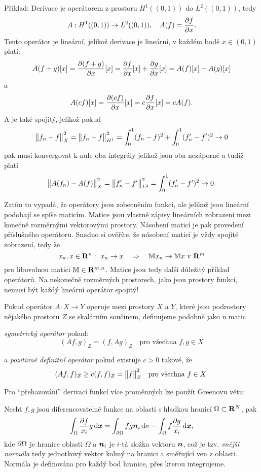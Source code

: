 Příklad: Derivace je operátorem z prostoru $H^1((0,1))$ do $L^2((0,1))$, tedy
\[
        A:H^1((0,1)) \rightarrow L^2((0,1)),\quad A(f)=\frac{\partial f}{\partial x}.
\]
Tento operátor je lineární, jelikož derivace je lineární, v každém bodě $x\in (0,1)$ platí:
\[
        A(f+g)[x]=\frac{\partial(f+g)}{\partial x}[x]=
        \frac{\partial f}{\partial x}[x] +\frac{\partial g}{\partial x}[x]=A(f)[x]+A(g)[x]  
\]
a
\[
  A(cf)[x]=\frac{\partial (cf)}{\partial x}[x]=c\frac{\partial f}{\partial x}[x]=cA(f).
\]
A je také spojitý, jelikož pokud 
\[
   \bigl\Vert f_n - f\bigr\Vert_X^2 = \bigl\Vert f_n - f\bigr\Vert^2_{H^1}=\int_0^1 (f_n-f)^2 +\int_0^1 (f'_n-f')^2 \rightarrow 0
\]
pak musí konvergovat k nule oba integrály jelikož jsou oba nezáporné a tudíž platí
\[
  \bigl\Vert A(f_n) - A(f) \bigr\Vert^2_X =\bigl\Vert f'_n-f'\bigr\Vert^2_{L^2} =\int_0^1 (f'_n-f')^2 \rightarrow 0. 
\]

Zatím to vypadá, že operátory jsou zobecněním funkcí, ale jelikož jsou lineární podobají se spíše maticím.
Matice jsou vlastně zápisy lineárních zobrazení mezi konečně rozměrnými vektorovými prostory. Násobení maticí je
pak provedení příslušného operátoru.  Snadno si ověříte, že násobení maticí je vždy spojité zobrazení, tedy že
\[
        x_n,x\in {\rm\bf R}^n:\ x_n \rightarrow x\quad \Rightarrow \quad {\mathbb{M}} x_n \rightarrow {\mathbb{M}} x \text{ v } {\rm\bf R}^m
\]
pro libovolnou matici ${\mathbb{M}}\in {\rm\bf R}^{m,n}$. Matice jsou tedy další důležitý příklad operátorů.
Na nekonečně rozměrných prostorech, jako jsou prostory funkcí, nemusí být každý lineární operátor spojitý!

Pokud operátor $A:X\to Y$ operuje mezi prostory $X$ a $Y$, které jsou podrostory nějakého prostoru $Z$ se
skalárním součinem, definujeme podobně jako u matic

{\it symetrický operátor} pokud:
\[      (Af,g)_Z = (f,Ag)_Z  \quad \text{pro všechna } f,g\in X \]
 
 a {\it pozitivně definitní operátor} pokud existuje $c>0$ takové, že
\[ (Af,f)_Z\ge c (f,f)_Z=\bigl\Vert f\bigr\Vert_Z^2\quad \text{pro všechna } f\in X. \]

Pro ``přehazování'' derivací funkcí více proměnných lze použít Greenovu větu:

\begin{theorem}
Nechť $f,g$ jsou diferencovatelné funkce na oblasti s hladkou hranicí $\Omega\subset {\rm\bf R}^N$, pak
\[
        \int_\Omega \frac{\partial f}{x_i} g\,{\rm d} \mathbf{\boldsymbol{x}} = \int_{\partial\Omega} fg \mathbf{\boldsymbol{n}}_i \,{\rm d}\sigma
          -\int_{\Omega} f\frac{\partial g}{x_i}\,{\rm d} \mathbf{\boldsymbol{x}},
\]
kde $\partial\Omega$ je hranice oblasti $\Omega$ a $\mathbf{\boldsymbol{n}}_i$ je $i$-tá složka vektoru $\mathbf{\boldsymbol{n}}$, což je tzv. {\it vnější normála} tedy jednotkový vektor kolmý na hranici a směřující ven z oblasti.
Normála je definována pro každý bod hranice, přes kterou integrujeme.
\end{theorem}



